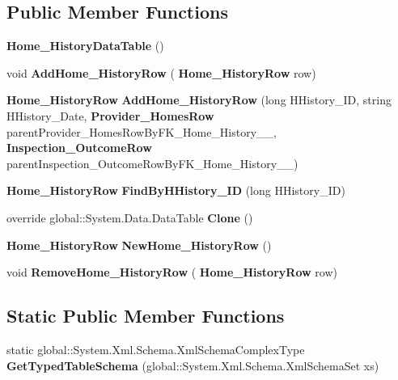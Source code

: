\subsection*{Public Member Functions}
\begin{DoxyCompactItemize}
\item 
\textbf{ Home\+\_\+\+History\+Data\+Table} ()
\item 
void \textbf{ Add\+Home\+\_\+\+History\+Row} (\textbf{ Home\+\_\+\+History\+Row} row)
\item 
\textbf{ Home\+\_\+\+History\+Row} \textbf{ Add\+Home\+\_\+\+History\+Row} (long H\+History\+\_\+\+ID, string H\+History\+\_\+\+Date, \textbf{ Provider\+\_\+\+Homes\+Row} parent\+Provider\+\_\+\+Homes\+Row\+By\+F\+K\+\_\+\+Home\+\_\+\+History\+\_\+\_, \textbf{ Inspection\+\_\+\+Outcome\+Row} parent\+Inspection\+\_\+\+Outcome\+Row\+By\+F\+K\+\_\+\+Home\+\_\+\+History\+\_\+\_)
\item 
\textbf{ Home\+\_\+\+History\+Row} \textbf{ Find\+By\+H\+History\+\_\+\+ID} (long H\+History\+\_\+\+ID)
\item 
override global\+::\+System.\+Data.\+Data\+Table \textbf{ Clone} ()
\item 
\textbf{ Home\+\_\+\+History\+Row} \textbf{ New\+Home\+\_\+\+History\+Row} ()
\item 
void \textbf{ Remove\+Home\+\_\+\+History\+Row} (\textbf{ Home\+\_\+\+History\+Row} row)
\end{DoxyCompactItemize}
\subsection*{Static Public Member Functions}
\begin{DoxyCompactItemize}
\item 
static global\+::\+System.\+Xml.\+Schema.\+Xml\+Schema\+Complex\+Type \textbf{ Get\+Typed\+Table\+Schema} (global\+::\+System.\+Xml.\+Schema.\+Xml\+Schema\+Set xs)
\end{DoxyCompactItemize}
